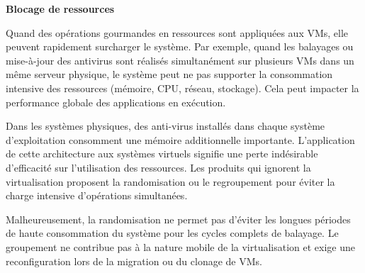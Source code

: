 \textbf{Blocage de ressources}

Quand des opérations gourmandes en ressources sont appliquées aux VMs, elle peuvent rapidement surcharger le système. Par exemple, quand les balayages ou mise-à-jour des antivirus sont réalisés simultanément sur plusieurs VMs dans un même serveur physique, le système peut ne pas supporter la consommation intensive des ressources (mémoire, CPU, réseau, stockage). Cela peut impacter la performance globale des applications en exécution.

Dans les systèmes physiques, des anti-virus installés dans chaque système d'exploitation consomment une mémoire additionnelle importante. L'application de cette architecture aux systèmes virtuels signifie une perte indésirable d'efficacité sur l'utilisation des ressources. Les produits qui ignorent la virtualisation proposent la randomisation ou le regroupement pour éviter la charge intensive d'opérations simultanées.

Malheureusement, la randomisation ne permet pas d'éviter les longues périodes de haute consommation du système pour les cycles complets de balayage. Le groupement ne contribue pas à la nature mobile de la virtualisation et exige une reconfiguration lors de la migration ou du clonage de VMs. 

